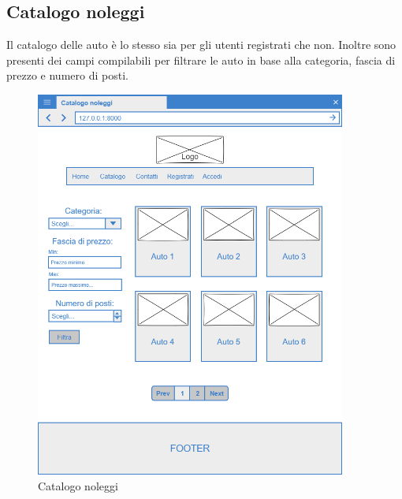 \documentclass[12pt,a4paperS]{report}
\begin{document}
\begin{normalsize}
			\subsection{Catalogo noleggi}
				Il catalogo delle auto è lo stesso sia per gli utenti registrati che non.
				\newline
				Inoltre sono presenti dei campi compilabili per filtrare le auto in base alla categoria, fascia di prezzo e numero di posti.
				\begin{figure}[H]
					\centering
					\includegraphics[width=0.91\textwidth, height=0.91\textheight, keepaspectratio]{Mockup/Catalogo.png}
					\caption{Catalogo noleggi}
				\end{figure}
			

\end{normalsize}
\end{document}
